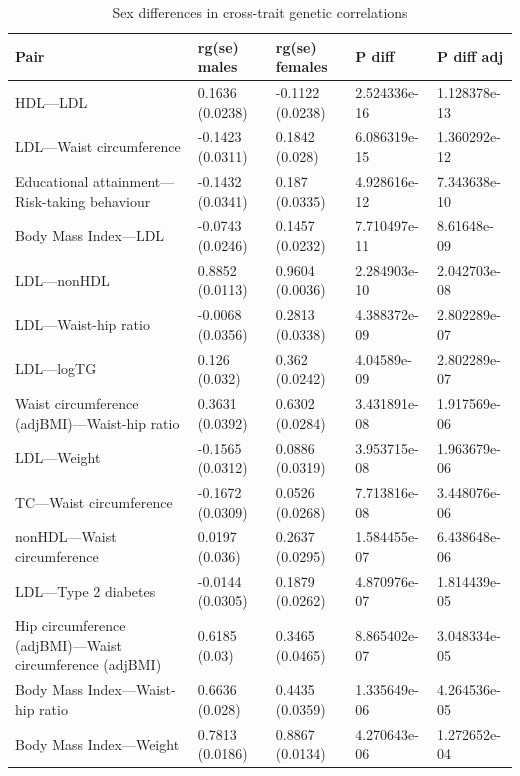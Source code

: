 \documentclass{article}\usepackage[]{graphicx}\usepackage[dvipsnames]{xcolor}
\begin{document}
\renewcommand{\arraystretch}{1.3}

% 
\setcounter{table}{3}
\renewcommand{\tablename}{Supplementary Table} %


\begin{longtable}{p{6cm}|p{1.5cm}|p{1.5cm}|p{1.5cm}}
\caption{Sex differences in cross-trait genetic correlations}\\
  \hline

  \hline
Pair & rg(se) males & rg(se) females & P diff & P diff adj \\ 
  \hline
HDL---LDL & 0.1636 (0.0238) & -0.1122 (0.0238) & 2.524336e-16 & 1.128378e-13 \\ 
  LDL---Waist circumference & -0.1423 (0.0311) & 0.1842 (0.028) & 6.086319e-15 & 1.360292e-12 \\ 
  Educational attainment---Risk-taking behaviour & -0.1432 (0.0341) & 0.187 (0.0335) & 4.928616e-12 & 7.343638e-10 \\ 
  Body Mass Index---LDL & -0.0743 (0.0246) & 0.1457 (0.0232) & 7.710497e-11 & 8.61648e-09 \\ 
  LDL---nonHDL & 0.8852 (0.0113) & 0.9604 (0.0036) & 2.284903e-10 & 2.042703e-08 \\ 
  LDL---Waist-hip ratio & -0.0068 (0.0356) & 0.2813 (0.0338) & 4.388372e-09 & 2.802289e-07 \\ 
  LDL---logTG & 0.126 (0.032) & 0.362 (0.0242) & 4.04589e-09 & 2.802289e-07 \\ 
  Waist circumference (adjBMI)---Waist-hip ratio & 0.3631 (0.0392) & 0.6302 (0.0284) & 3.431891e-08 & 1.917569e-06 \\ 
  LDL---Weight & -0.1565 (0.0312) & 0.0886 (0.0319) & 3.953715e-08 & 1.963679e-06 \\ 
  TC---Waist circumference & -0.1672 (0.0309) & 0.0526 (0.0268) & 7.713816e-08 & 3.448076e-06 \\ 
  nonHDL---Waist circumference & 0.0197 (0.036) & 0.2637 (0.0295) & 1.584455e-07 & 6.438648e-06 \\ 
  LDL---Type 2 diabetes & -0.0144 (0.0305) & 0.1879 (0.0262) & 4.870976e-07 & 1.814439e-05 \\ 
  Hip circumference (adjBMI)---Waist circumference (adjBMI) & 0.6185 (0.03) & 0.3465 (0.0465) & 8.865402e-07 & 3.048334e-05 \\ 
  Body Mass Index---Waist-hip ratio & 0.6636 (0.028) & 0.4435 (0.0359) & 1.335649e-06 & 4.264536e-05 \\ 
  Body Mass Index---Weight & 0.7813 (0.0186) & 0.8867 (0.0134) & 4.270643e-06 & 1.272652e-04 \\ 

\end{longtable}
\end{document}
